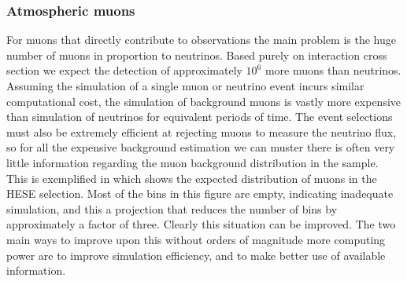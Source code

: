\subsubsection{Atmospheric muons}
For muons that directly contribute to observations the main problem is the huge number of muons in proportion to neutrinos.
Based purely on interaction cross section we expect the detection of approximately $10^6$ more muons than neutrinos.
Assuming the simulation of a single muon or neutrino event incurs similar computational cost, the simulation of background muons is vastly more expensive than simulation of neutrinos for equivalent periods of time.
The event selections must also be extremely efficient at rejecting muons to measure the neutrino flux, so for all the expensive background estimation we can muster there is often very little information regarding the muon background distribution in the sample.
This is exemplified in  which shows the expected distribution of muons in the HESE selection.
Most of the bins in this figure are empty, indicating inadequate simulation, and this a projection that reduces the number of bins by approximately a factor of three.
Clearly this situation can be improved.
The two main ways to improve upon this without orders of magnitude more computing power are to improve simulation efficiency, and to make better use of available information.

